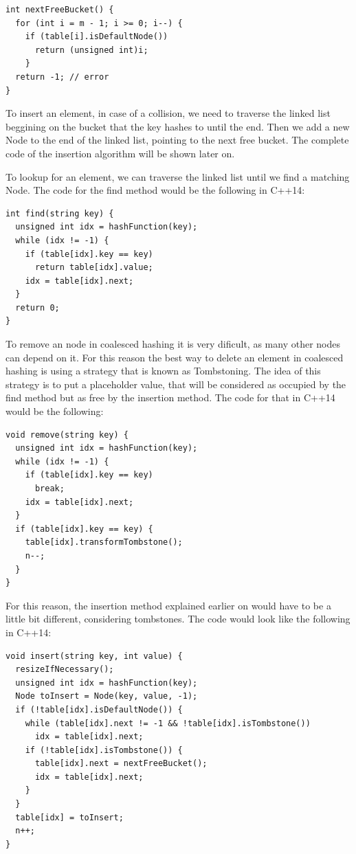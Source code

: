 \begin{lstlisting}
int nextFreeBucket() {
  for (int i = m - 1; i >= 0; i--) {
    if (table[i].isDefaultNode())
      return (unsigned int)i;
    }
  return -1; // error
}
\end{lstlisting}

To insert an element, in case of a collision, we need to traverse the linked list beggining on the bucket that the key hashes to until the end. Then we add a new Node to the end of the linked list, pointing to the next free bucket. The complete code of the insertion algorithm will be shown later on.

To lookup for an element, we can traverse the linked list until we find a matching Node. The code for the find method would be the following in C++14:

\begin{lstlisting}
int find(string key) {
  unsigned int idx = hashFunction(key);
  while (idx != -1) {
    if (table[idx].key == key) 
      return table[idx].value;
    idx = table[idx].next;         
  }    
  return 0;
}
\end{lstlisting}

To remove an node in coalesced hashing it is very dificult, as many other nodes can depend on it. For this reason the best way to delete an element in coalesced hashing is using a strategy that is known as Tombstoning. The idea of this strategy is to put a placeholder value, that will be considered as occupied by the find method but as free by the insertion method. The code for that in C++14 would be the following:

\begin{lstlisting}
void remove(string key) {
  unsigned int idx = hashFunction(key);
  while (idx != -1) {
    if (table[idx].key == key) 
      break;
    idx = table[idx].next;         
  }
  if (table[idx].key == key) {
    table[idx].transformTombstone();
    n--;
  }
}
\end{lstlisting}

For this reason, the insertion method explained earlier on would have to be a little bit different, considering tombstones. The code would look like the following in C++14:

\begin{lstlisting}
void insert(string key, int value) {
  resizeIfNecessary();
  unsigned int idx = hashFunction(key);
  Node toInsert = Node(key, value, -1);
  if (!table[idx].isDefaultNode()) {
    while (table[idx].next != -1 && !table[idx].isTombstone())
      idx = table[idx].next; 
    if (!table[idx].isTombstone()) {
      table[idx].next = nextFreeBucket();
      idx = table[idx].next;
    }
  }
  table[idx] = toInsert;
  n++;
}
\end{lstlisting}

